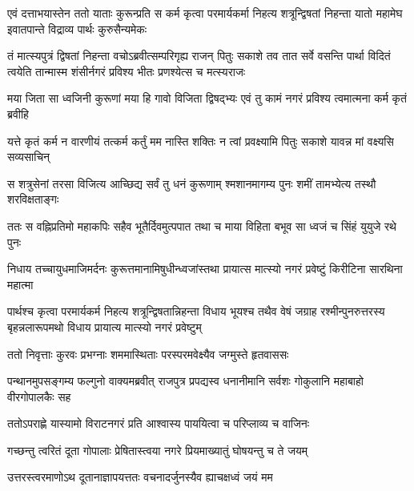 \onelineshloka
{एवं दत्ताभयास्तेन ततो याताः कुरून्प्रति}
\twolineshloka
{स कर्म कृत्वा परमार्यकर्मा निहत्य शत्रून्द्विषतां निहन्ता}
{यातो महामेघ इवातपान्ते विद्राव्य पार्थः कुरुसैन्यमेकः}


\onelineshloka
{तं मात्स्यपुत्रं द्विषतां निहन्ता वचोऽब्रवीत्सम्परिगृह्य राजन्}
\twolineshloka
{पितुः सकाशे तव तात सर्वे वसन्ति पार्था विदितं त्वयेति}
{तान्मास्म शंसीर्नगरं प्रविश्य भीतः प्रणश्येत्स च मत्स्यराजः}


\twolineshloka
{मया जिता सा ध्वजिनी कुरूणां मया हि गावो विजिता द्विषद्भ्यः}
{एवं तु कामं नगरं प्रविश्य त्वमात्मना कर्म कृतं ब्रवीहि}




\twolineshloka
{यत्ते कृतं कर्म न वारणीयं तत्कर्म कर्तुं मम नास्ति शक्तिः}
{न त्वां प्रवक्ष्यामि पितुः सकाशे यावन्न मां वक्ष्यसि सव्यसाचिन्}




\twolineshloka
{स शत्रुसेनां तरसा विजित्य आच्छिद्य सर्वं तु धनं कुरूणाम्}
{श्मशानमागम्य पुनः शमीं तामभ्येत्य तस्थौ शरविक्षताङ्गः}


\twolineshloka
{ततः स वह्निप्रतिमो महाकपिः सहैव भूतैर्दिवमुत्पपात}
{तथा च माया विहिता बभूव सा ध्वजं च सिंहं युयुजे रथे पुनः}


\twolineshloka
{निधाय तच्चायुधमाजिमर्दनः कुरूत्तमानामिषुधीन्ध्वजांस्तथा}
{प्रायात्स मात्स्यो नगरं प्रवेष्टुं किरीटिना सारथिना महात्मा}


\threelineshloka
{पार्थश्च कृत्वा परमार्यकर्म निहत्य शत्रून्द्विषतान्निहन्ता}
{विधाय भूयश्च तथैव वेषं जग्राह रश्मीन्पुनरुत्तरस्य}
{बृहन्नलारूपमथो विधाय प्रायात्य मात्स्यो नगरं प्रवेष्टुम्}



\twolineshloka
{ततो निवृत्ताः कुरवः प्रभग्नाः शममास्थिताः}
{परस्परमवेक्ष्यैव जग्मुस्ते हृतवाससः}


\threelineshloka
{पन्थानमुपसङ्गम्य फल्गुनो वाक्यमब्रवीत्}
{राजपुत्र प्रपद्यस्व धनानीमानि सर्वशः}
{गोकुलानि महाबाहो वीरगोपालकैः सह}


\twolineshloka
{ततोऽपराह्णे यास्यामो विराटनगरं प्रति}
{आश्वास्य पाययित्वा च परिप्लाव्य च वाजिनः}



\twolineshloka
{गच्छन्तु त्वरितं दूता गोपालाः प्रेषितास्त्वया}
{नगरे प्रियमाख्यातुं घोषयन्तु च ते जयम्}


\twolineshloka
{उत्तरस्त्वरमाणोऽथ दूतानाज्ञापयत्ततः}
{वचनादर्जुनस्यैव ह्याचक्षध्वं जयं मम}


